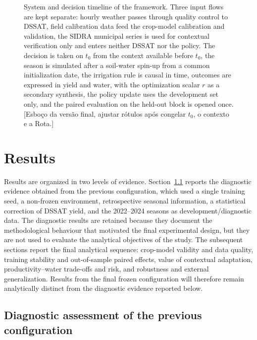 \documentclass[times,final,authoryear]{elsarticle}
\begin{document}
\begin{figure}[!h]
{}
\caption{System and decision timeline of the framework. Three input flows are kept separate: hourly weather passes through quality control to DSSAT, field calibration data feed the crop-model calibration and validation, the SIDRA municipal series is used for contextual verification only and enters neither DSSAT nor the policy. The decision is taken on $t_0$ from the context available before $t_0$, the season is simulated after a soil-water spin-up from a common initialization date, the irrigation rule is causal in time, outcomes are expressed in yield and water, with the optimization scalar $r$ as a secondary synthesis, the policy update uses the development set only, and the paired evaluation on the held-out block is opened once. [Esboço da versão final, ajustar rótulos após congelar $t_0$, o contexto e a Rota.]}
\label{fig:flowchart_dssat_ppo}
\end{figure}


\section{Results}
\label{resultados}

Results are organized in two levels of evidence. Section~\ref{subres_diagnostic} reports the diagnostic evidence obtained from the previous configuration, which used a single training seed, a non-frozen environment, retrospective seasonal information, a statistical correction of DSSAT yield, and the 2022--2024 seasons as development/diagnostic data. The diagnostic results are retained because they document the methodological behaviour that motivated the final experimental design, but they are not used to evaluate the analytical objectives of the study. The subsequent sections report the final analytical sequence: crop-model validity and data quality, training stability and out-of-sample paired effects, value of contextual adaptation, productivity--water trade-offs and risk, and robustness and external generalization. Results from the final frozen configuration will therefore remain analytically distinct from the diagnostic evidence reported below.

\subsection{Diagnostic assessment of the previous configuration}
\label{subres_diagnostic}
\end{document}
